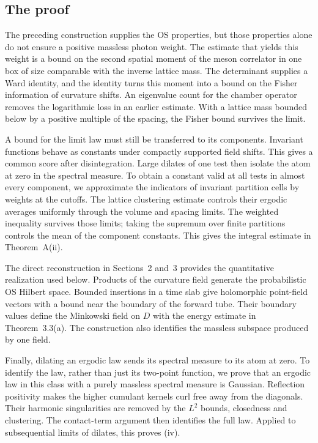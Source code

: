 \documentclass[11pt,letterpaper,reqno]{amsart}
\theoremstyle{definition}
\begin{document}
\subsection*{The proof}
The preceding construction supplies the OS properties, but those
properties alone do not ensure a positive massless photon weight.
The estimate that yields this weight is a bound on the second spatial
moment of the meson correlator in one box of size comparable with the
inverse lattice mass. The determinant supplies a Ward identity, and the
identity turns this moment into a bound on the Fisher information of
curvature shifts. An eigenvalue count for the chamber operator removes
the logarithmic loss in an earlier estimate. With a lattice mass bounded
below by a positive multiple of the spacing, the Fisher bound survives
the limit.

A bound for the limit law must still be transferred to its components.
Invariant functions behave as constants under compactly supported
field shifts. This gives a common score after disintegration. Large
dilates of one test then isolate the atom at zero in the spectral measure.
To obtain a constant valid at all tests in almost every component, we
approximate the indicators of invariant partition cells by weights at
the cutoffs. The lattice clustering estimate controls their ergodic
averages uniformly through the volume and spacing limits. The weighted
inequality survives those limits; taking the supremum over finite
partitions controls the mean of the component constants. This gives
the integral estimate in Theorem~A(ii).

The direct reconstruction in Sections~2 and~3 provides the quantitative
realization used below. Products of the curvature field generate the
probabilistic OS Hilbert space. Bounded insertions in a time slab give
holomorphic point-field vectors with a bound near the boundary of the
forward tube. Their boundary values define the Minkowski field on
$D$ with the energy estimate in Theorem~3.3(a). The construction also
identifies the massless subspace produced by one field.

Finally, dilating an ergodic law sends its spectral measure to its atom
at zero. To identify the law, rather than just its two-point function,
we prove that an ergodic law in this class with a purely massless
spectral measure is Gaussian. Reflection positivity makes the higher
cumulant kernels curl free away from the diagonals. Their harmonic
singularities are removed by the $L^2$ bounds, closedness and clustering.
The contact-term argument then identifies the full law. Applied to
subsequential limits of dilates, this proves (iv).
\end{document}
